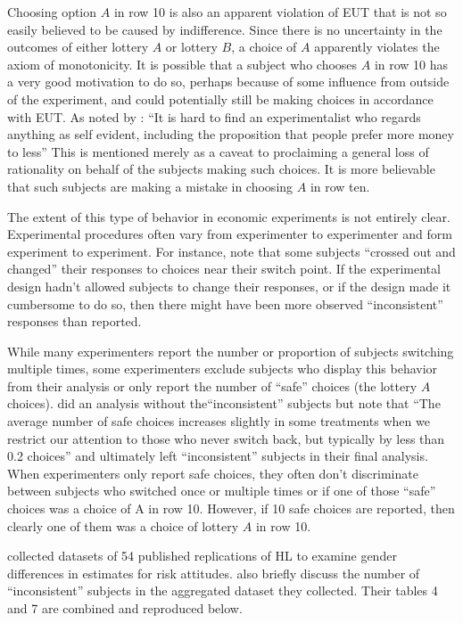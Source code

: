 \documentclass[11pt,a4paper]{report}
\begin{document}
Choosing option $A$ in row 10 is also an apparent violation of EUT that is not so easily believed to be caused by indifference.
Since there is no uncertainty in the outcomes of either lottery $A$ or lottery $B$, a choice of $A$ apparently violates the axiom of monotonicity.
It is possible that a subject who chooses $A$ in row 10 has a very good motivation to do so, perhaps because of some influence from outside of the experiment, and could potentially still be making choices in accordance with EUT.
As noted by \textcite[930]{Smith1982}: \enquote{It is hard to find an experimentalist who regards anything as self evident, including the proposition that people prefer more money to less}
This is mentioned merely as a caveat to proclaiming a general loss of rationality on behalf of the subjects making such choices. It is more believable that such subjects are making a mistake in choosing $A$ in row ten.

The extent of this type of behavior in economic experiments is not entirely clear.
Experimental procedures often vary from experimenter to experimenter and form experiment to experiment.
For instance, \textcite{Holt2002} note that some subjects \enquote{crossed out and changed} their responses to choices near their switch point.
If the experimental design hadn't allowed subjects to change their responses, or if the design made it cumbersome to do so, then there might have been more observed \enquote{inconsistent} responses than reported. 

While many experimenters report the number or proportion of subjects switching multiple times, some experimenters exclude subjects who display this behavior from their analysis or only report the number of \enquote{safe} choices (the lottery $A$ choices).
\textcite[1648]{Holt2002} did an analysis without the\enquote{inconsistent} subjects but note that \enquote{The average number of safe choices increases slightly in some treatments when we restrict our attention to those who never switch back, but typically by less than 0.2 choices} and ultimately left \enquote{inconsistent} subjects in their final analysis.
When experimenters only report safe choices, they often don't discriminate between subjects who switched once or multiple times or if one of those \enquote{safe} choices was a choice of A in row 10.
However, if 10 safe choices are reported, then clearly one of them was a choice of lottery $A$ in row 10.

\textcite[9]{Filippin2014} collected datasets of 54 published replications of HL to examine gender differences in estimates for risk attitudes.
\textcite[10-11, 17-18]{Filippin2014} also briefly discuss the number of \enquote{inconsistent} subjects in the aggregated dataset they collected.
Their tables 4 and 7 are combined and reproduced below.
\end{document}
